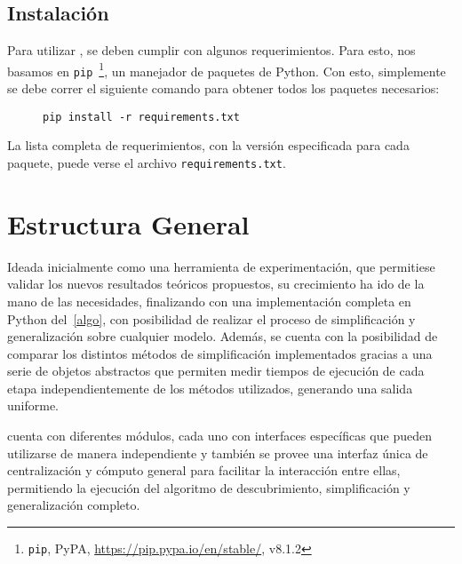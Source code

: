 
\subsection*{Instalación}
Para utilizar \pachtool, se deben cumplir con algunos requerimientos. Para esto, 
nos basamos en \texttt{pip}~\footnote{\texttt{pip}, PyPA, \url{https://pip.pypa.io/en/stable/}, v8.1.2},
un manejador de paquetes de Python. Con esto,
simplemente se debe correr el siguiente comando para obtener todos los
paquetes necesarios:

\begin{figure}[H]
    \centering
    \begin{Verbatim}[frame=single,fontsize=\scriptsize]
        pip install -r requirements.txt
    \end{Verbatim}
    \label{ej:pip_install}
\end{figure}

La lista completa de requerimientos, con la versión especificada para cada paquete,
puede verse el archivo \texttt{requirements.txt}.

\section{Estructura General}
\label{sec:4.general}

Ideada inicialmente como una herramienta de experimentación,
que permitiese validar los nuevos resultados teóricos propuestos, su crecimiento ha ido de la mano
de las necesidades, finalizando con una implementación completa en Python del~\autoref{algo},
con posibilidad de realizar el proceso de simplificación y generalización sobre cualquier modelo.
Además, se cuenta con la posibilidad de comparar los distintos métodos de simplificación
implementados gracias a una serie de objetos abstractos que permiten medir tiempos de 
ejecución de cada etapa independientemente de los métodos utilizados, 
generando una salida uniforme.

\pachtool cuenta con diferentes módulos, cada uno con interfaces específicas que pueden utilizarse de manera
independiente y también se provee una interfaz única de centralización y cómputo general para 
facilitar la interacción entre ellas, permitiendo la ejecución del algoritmo 
de descubrimiento, simplificación y generalización completo.

